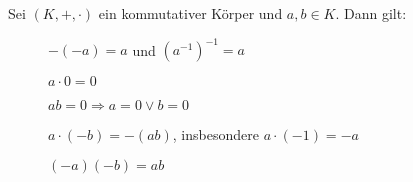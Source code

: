 Sei $(K, +, \cdot)$ ein kommutativer Körper und $a, b \in K$. Dann gilt:
\begin{description}
    \item[] $-(-a) = a$ und $(a^{-1})^{-1} = a$
    \item[] $a \cdot 0 = 0$
    \item[] $ab = 0 \Longrightarrow a = 0 \lor b = 0$
    \item[] $a \cdot (-b) = -(ab)$, insbesondere $a \cdot (-1) = -a$
    \item[] $(-a)(-b) = ab$
\end{description}